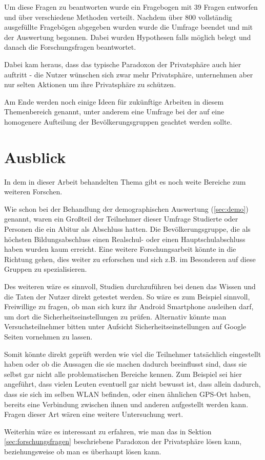 Um diese Fragen zu beantworten wurde ein Fragebogen mit 39 Fragen entworfen und über verschiedene Methoden verteilt. Nachdem über 800 vollständig ausgefüllte Fragebögen abgegeben wurden wurde die Umfrage beendet und mit der Auswertung begonnen. Dabei wurden Hypothesen falls möglich belegt und danach die Forschungsfragen beantwortet. 

Dabei kam heraus, dass das typische Paradoxon der Privatsphäre auch hier auftritt - die Nutzer wünschen sich zwar mehr Privatsphäre, unternehmen aber nur selten Aktionen um ihre Privatsphäre zu schützen.

Am Ende werden noch einige Ideen für zukünftige Arbeiten in diesem Themenbereich genannt, unter anderem eine Umfrage bei der auf eine homogenere Aufteilung der Bevölkerungsgruppen geachtet werden sollte.

\section{Ausblick}
In dem in dieser Arbeit behandelten Thema gibt es noch weite Bereiche zum weiteren Forschen.

Wie schon bei der Behandlung der demographischen Auswertung (\ref{sec:demo}) genannt, waren ein Großteil der Teilnehmer dieser Umfrage Studierte oder Personen die ein Abitur als Abschluss hatten. Die Bevölkerungsgruppe, die als höchsten Bildungsabschluss einen Realschul- oder einen Hauptschulabschluss haben wurden kaum erreicht. Eine weitere Forschungsarbeit könnte in die Richtung gehen, dies weiter zu erforschen und sich z.B. im Besonderen auf diese Gruppen zu spezialisieren.

Des weiteren wäre es sinnvoll, Studien durchzuführen bei denen das Wissen und die Taten der Nutzer direkt getestet werden. So wäre es zum Beispiel sinnvoll, Freiwillige zu fragen, ob man sich kurz ihr Android Smartphone ausleihen darf, um dort die Sicherheitseinstellungen zu prüfen. Alternativ könnte man Versuchsteilnehmer bitten unter Aufsicht Sicherheitseinstellungen auf Google Seiten vornehmen zu lassen.

Somit könnte direkt geprüft werden wie viel die Teilnehmer tatsächlich eingestellt haben oder ob die Aussagen die sie machen dadurch beeinflusst sind, dass sie selbst gar nicht alle problematischen Bereiche kennen. Zum Beispiel sei hier angeführt, dass vielen Leuten eventuell gar nicht bewusst ist, dass allein dadurch, dass sie sich im selben WLAN befinden, oder einen ähnlichen GPS-Ort haben, bereits eine Verbindung zwischen ihnen und anderen aufgestellt werden kann. Fragen dieser Art wären eine weitere Untersuchung wert.

Weiterhin wäre es interessant zu erfahren, wie man das in Sektion \ref{sec:forschungsfragen} beschriebene Paradoxon der Privatsphäre lösen kann, beziehungsweise ob man es überhaupt lösen kann.
